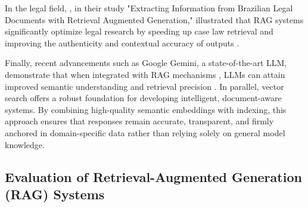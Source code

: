 \begin{refsection}
\hspace{0.4cm}In the legal field, \citeauthor{aquino2024extracting} \citeyear{aquino2024extracting}, in their study "Extracting Information from Brazilian Legal Documents with Retrieval Augmented Generation," illustrated that RAG systems significantly optimize legal research by speeding up case law retrieval and improving the authenticity and contextual accuracy of outputs \cite{aquino2024extracting}. 


\hspace{0.4cm}Finally, recent advancements such as Google Gemini, a state-of-the-art LLM, demonstrate that when integrated with RAG mechanisms \citeauthor{prabhulal2025ragpipeline} \citeyear{prabhulal2025ragpipeline}, LLMs can attain improved semantic understanding and retrieval precision \cite{prabhulal2025ragpipeline}. In parallel, vector search offers a robust foundation for developing intelligent, document-aware systems. By combining high-quality semantic embeddings with indexing, this approach ensures that responses remain accurate, transparent, and firmly anchored in domain-specific data rather than relying solely on general model knowledge.


\subsection{Evaluation of Retrieval-Augmented Generation (RAG) Systems}


\end{refsection}
